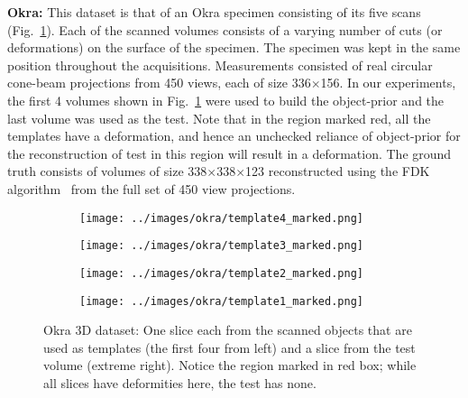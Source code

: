 \documentclass[journal]{IEEEtran}
\begin{document}
 \textbf{Okra:} This dataset is that of an Okra specimen consisting of
 its five scans (Fig.~\ref{fig:object-prior_test_okra}). Each of the
 scanned volumes consists of a varying number of cuts (or
 deformations) on the surface of the specimen. The specimen was kept
 in the same position throughout the acquisitions. Measurements
 consisted of real circular cone-beam projections from 450 views, each
 of size 336$\times$156.
In our experiments, the first 4 volumes shown in
Fig.~\ref{fig:object-prior_test_okra} were used to build the
object-prior and the last volume was used as the test. Note that in
the region marked red, all the templates have a deformation, and hence
an unchecked reliance of object-prior for the reconstruction of test
in this region will result in a deformation. The ground truth consists
of volumes of size 338$\times$338$\times$123 reconstructed using the
FDK algorithm~\cite{FDK} from the full set of
450 view projections.  

\begin{figure}[!h]
  \begin{subfigure}[b]{0.18\linewidth}
        \texttt{[image: ../images/okra/template4\_marked.png]}
\captionsetup{labelformat=empty}
        \caption{}
  \end{subfigure}
  \begin{subfigure}[b]{0.18\linewidth}
        \texttt{[image: ../images/okra/template3\_marked.png]}
\captionsetup{labelformat=empty}
        \caption{}
     \end{subfigure}
    \begin{subfigure}[b]{0.18\linewidth}
        \texttt{[image: ../images/okra/template2\_marked.png]}
\captionsetup{labelformat=empty}
        \caption{}
    \end{subfigure}
     \begin{subfigure}[b]{0.18\linewidth}
        \texttt{[image: ../images/okra/template1\_marked.png]}
\captionsetup{labelformat=empty}       
 \caption{}
    \end{subfigure}
     \begin{subfigure}[b]{0.148\linewidth}
\captionsetup{labelformat=empty}
        \caption{}
    \end{subfigure}
     \caption{Okra 3D dataset: One slice each from the scanned objects
       that are used as templates (the first four from left) and a
       slice from the test volume (extreme right). Notice the region
       marked in red box; while all slices have deformities here, the
       test has none.}
\label{fig:object-prior_test_okra}
\end{figure}
\end{document}
